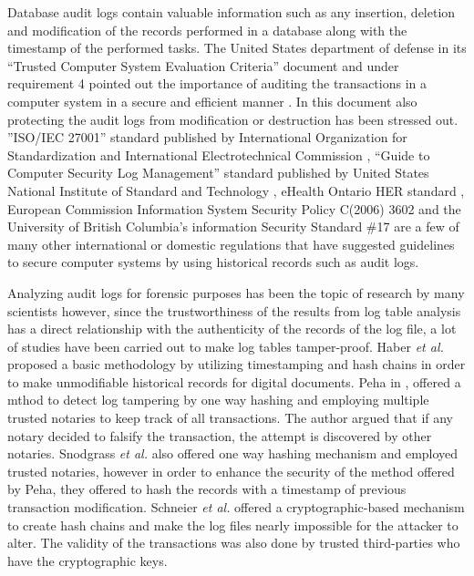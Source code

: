 Database audit logs contain valuable information such as any insertion, deletion and modification of the records performed in a database along with the timestamp of the performed tasks. The United States department of defense in its “Trusted Computer System Evaluation Criteria” document and under requirement 4 pointed out the importance of auditing the transactions in a computer system in a secure and efficient manner \cite{USDoD1985}. In this document also protecting the audit logs from modification or destruction has been stressed out. ”ISO/IEC 27001” standard published by International Organization for Standardization and International Electrotechnical Commission \cite{ISOIEC27001}, “Guide to Computer Security Log Management” standard published by United States National Institute of Standard and Technology \cite{NIST2006}, eHealth Ontario HER standard \cite{ehealth3542}, European Commission Information System Security Policy C(2006) 3602 \cite{EC2006} and the University of British Columbia's information Security Standard {\#}17 \cite{UBC2014} are a few of many other international or domestic regulations that have suggested guidelines to secure computer systems by using historical records such as audit logs.

Analyzing audit logs for forensic purposes has been the topic of research by many scientists however, since the trustworthiness of the results from log table analysis has a direct relationship with the authenticity of the records of the log file, a lot of studies have been carried out to make log tables tamper-proof. Haber {\it et al.}\cite{haber1991how} proposed a basic methodology by utilizing timestamping and hash chains in order to make unmodifiable historical records for digital documents. Peha in \cite{peha1999electronic}, offered a mthod to detect log tampering by one way hashing and employing multiple trusted notaries to keep track of all transactions. The author argued that if any notary decided to falsify the transaction, the attempt is discovered by other notaries. Snodgrass {\it et al.} \cite{snodgrass2004Tamper} also offered one way hashing mechanism and employed trusted notaries, however in order to enhance the security of the method offered by Peha, they offered to hash the records with a timestamp of previous transaction modification. Schneier {\it et al.}\cite{schneier1998cryptoraphic} offered a cryptographic-based mechanism to create hash chains and make the log files nearly impossible for the attacker to alter. The validity of the transactions was also done by trusted third-parties who have the cryptographic keys.

